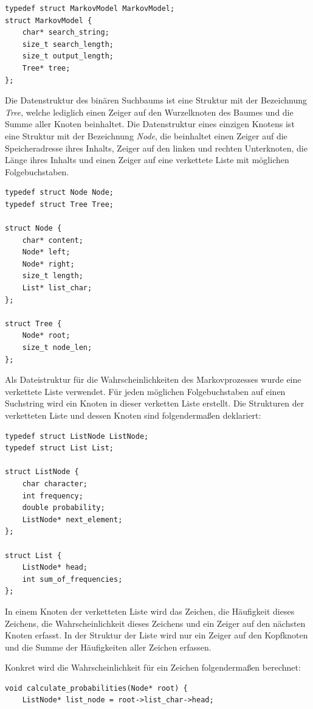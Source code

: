 \documentclass[10pt,a4paper]{article}
\begin{document}
\begin{spacing}{1}
\begin{lstlisting}
typedef struct MarkovModel MarkovModel;
struct MarkovModel {
    char* search_string;
    size_t search_length;
    size_t output_length;
    Tree* tree;
};
\end{lstlisting}

Die Datenstruktur des binären Suchbaums ist eine Struktur mit der Bezeichnung
{\it Tree\/}, welche lediglich einen Zeiger auf den Wurzelknoten des Baumes
und die Summe aller Knoten beinhaltet. Die Datenstruktur eines einzigen Knotens
ist eine Struktur mit der Bezeichnung {\it Node\/}, die beinhaltet einen Zeiger
auf die Speicheradresse ihres Inhalts, Zeiger auf den linken und rechten
Unterknoten, die Länge ihres Inhalts und einen Zeiger auf eine verkettete Liste
mit möglichen Folgebuchstaben.

\begin{lstlisting}
typedef struct Node Node;
typedef struct Tree Tree;

struct Node {
    char* content;
    Node* left;
    Node* right;
    size_t length;
    List* list_char;
};

struct Tree {
    Node* root;
    size_t node_len;
};
\end{lstlisting}

Als Dateistruktur für die Wahrscheinlichkeiten des Markovprozesses wurde eine
verkettete Liste verwendet. Für jeden möglichen Folgebuchstaben auf einen Suchstring wird ein
Knoten in dieser verketten Liste erstellt. Die Strukturen der verketteten Liste
und dessen Knoten sind folgendermaßen deklariert:
\begin{lstlisting}
typedef struct ListNode ListNode;
typedef struct List List;

struct ListNode {
    char character;
    int frequency;
    double probability;
    ListNode* next_element;
};

struct List {
    ListNode* head;
    int sum_of_frequencies;
};
\end{lstlisting}
In einem Knoten der verketteten Liste wird das Zeichen, die Häufigkeit dieses
Zeichens, die Wahrscheinlichkeit dieses Zeichens und ein Zeiger auf den nächsten
Knoten erfasst. In der Struktur der Liste wird nur ein Zeiger auf den
Kopfknoten und die Summe der Häufigkeiten aller Zeichen erfassen.

Konkret wird die Wahrscheinlichkeit für ein Zeichen folgendermaßen berechnet:
\begin{lstlisting}
void calculate_probabilities(Node* root) {
    ListNode* list_node = root->list_char->head;


\end{lstlisting}
\end{spacing}
\end{document}
